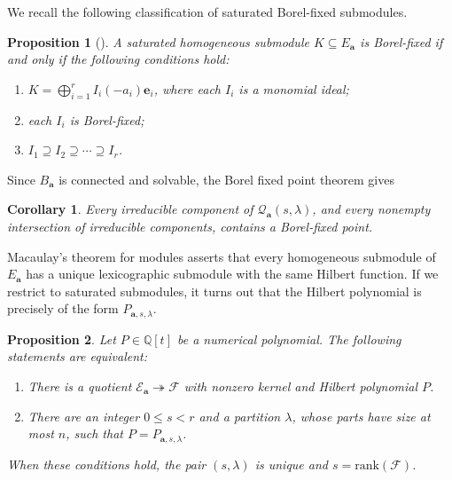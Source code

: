 \documentclass[leqno,11pt,a4paper]{amsart}
\newtheorem{cor}[cor]{Corollary}
\newtheorem{prop}[prop]{Proposition}
\theoremstyle{definition}
\numberwithin{equation}{section}
\newcommand{\bbQ}{\mathbb{Q}}
\newcommand{\bfa}{\mathbf{a}}
\newcommand{\bfe}{\mathbf{e}}
\newcommand{\EE}{\mathscr{E}}
\newcommand{\FF}{\mathscr{F}}
\newcommand{\QQ}{\mathcal{Q}}
\begin{document}
We recall the following classification of saturated Borel-fixed submodules.

\begin{prop}[{\cite[Proposition 6]{Pardue}}] \label{Pardue_Borel}
\label{Borel_char}
A saturated homogeneous submodule $K\subseteq E_{\bfa}$ is Borel-fixed if and only if the following conditions hold:
\begin{enumerate}
\item $K=\bigoplus_{i=1}^r I_i(-a_i)\bfe_i$, where each $I_i$
is a monomial ideal;
\item each $I_i$ is Borel-fixed;
\item $I_1\supseteq I_2 \supseteq \cdots \supseteq I_r$.
\end{enumerate}
\end{prop}


Since $B_{\mathbf a}$ is connected and solvable, the Borel fixed point theorem gives

\begin{cor}\label{cor:borel-intersections}
Every irreducible component of $\QQ_{\bfa}(s,\lambda)$, and every nonempty intersection of irreducible components, contains a Borel-fixed point.
\end{cor}

Macaulay's theorem for modules asserts that every homogeneous submodule of $E_{\mathbf a}$ has a unique lexicographic submodule with the same Hilbert function. 
If we restrict to saturated submodules, it turns out that the Hilbert polynomial is precisely of the form $P_{\bfa,s,\lambda}$.

 
 \begin{prop}\label{Macaulay}
Let $P \in \bbQ[t]$ be a numerical polynomial.
The following statements are equivalent:
\begin{enumerate}
\item There is a quotient $\EE_{\bfa}\twoheadrightarrow\FF$ with nonzero kernel and Hilbert polynomial $P$.
\item There are an integer $0\leq s<r$ and a partition $\lambda$, whose parts have size at most $n$, such that $P=P_{\bfa,s,\lambda}$.
\end{enumerate}
When these conditions hold, the pair $(s,\lambda)$ is unique and $s=\mathrm{rank}(\FF)$.
\end{prop}
\end{document}
